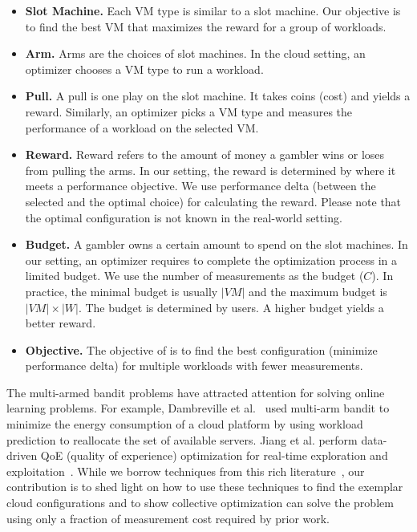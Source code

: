 \begin{itemize}
\item \textbf{Slot Machine.} Each VM type is similar to a slot machine. Our objective is to find the best VM that maximizes the reward for a group of workloads.
\item \textbf{Arm.} Arms are the choices of slot machines. In the cloud setting, an optimizer chooses a VM type to run a workload.
\item \textbf{Pull.} A pull is one play on the slot machine. It takes coins (cost) and yields a reward.
Similarly, an optimizer picks a VM type and measures the performance of a workload on the selected VM.
\item \textbf{Reward.} Reward refers to the amount of money a gambler wins or loses from pulling the arms.
In our setting, the reward is determined by where it meets a performance objective.
We use performance delta (between the selected and the optimal choice) for calculating the reward.
Please note that the optimal configuration is not known in the real-world setting.
\item \textbf{Budget.}
A gambler owns a certain amount to spend on the slot machines.
In our setting, an optimizer requires to complete the optimization process in a limited budget.
We use the number of measurements as the budget ($C$).
In practice, the minimal budget is usually $|\mathit{VM}|$
and the maximum budget is $|\mathit{VM}| \times |\mathit{W}|$.
The budget is determined by users.
A higher budget yields a better reward.
\item \textbf{Objective.}
The objective of \micky is to find the best configuration (minimize performance delta) for multiple workloads with fewer measurements.
\end{itemize}

The multi-armed bandit problems have attracted attention for solving online learning problems.
For example, 
Dambreville et al.~\cite{dambreville2017load} used multi-arm bandit to minimize the energy consumption of a cloud platform by
using workload prediction to reallocate the set of available servers.
Jiang et al. perform data-driven QoE (quality of experience) optimization for real-time exploration and exploitation~\cite{jiang2017pytheas}.
While we borrow techniques from this rich literature~\cite{bergemann2006bandit}, our contribution is to shed light on how to use these techniques to find the exemplar cloud configurations and to show collective optimization can solve the problem using only a fraction of measurement cost required by prior work.


